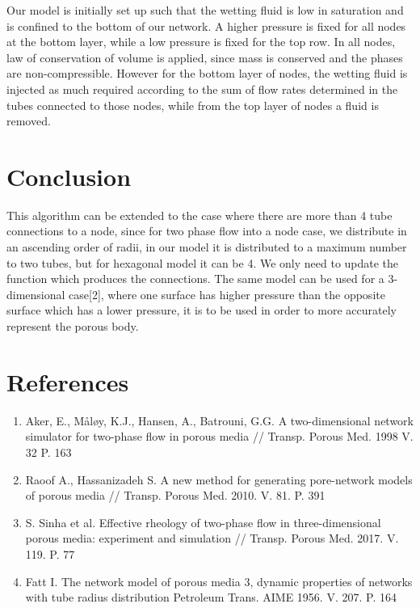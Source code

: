 \documentclass[12pt]{report}
\begin{document}
	Our model is initially set up such that the wetting fluid is low in saturation and is confined to the bottom of our network. A higher pressure is fixed for all nodes at the bottom layer, while a  low pressure is fixed for the top row. In all nodes, law of conservation of volume is applied, since mass is conserved and the phases are non-compressible. However for the bottom layer of nodes, the wetting fluid is injected as much required according to the sum of flow rates determined in the tubes connected to those nodes, while from the top layer of nodes a fluid is removed.
	\section{Conclusion}
	This algorithm can be extended to the case where there are more than 4 tube connections to a node, since for two phase flow into a node case, we distribute in an ascending order of radii, in our model it is distributed to a maximum number to two tubes, but for hexagonal model it can be 4. We only need to update the function which produces the connections. The same model can be used for a 3-dimensional case[2], where one surface has higher pressure than the opposite surface which has a lower pressure, it is to be used in order to more accurately represent the porous body.


\section{References}
	\begin{enumerate}
		\item Aker, E., Måløy, K.J., Hansen, A., Batrouni, G.G. A two-dimensional network simulator for two-phase flow in porous media // Transp. Porous Med. 1998 V. 32 P. 163 
		\item Raoof A., Hassanizadeh S. A new method for generating pore-network models of porous media // Transp. Porous Med. 2010. V. 81. P. 391
		\item S. Sinha et al. Effective rheology of two-phase flow in three-dimensional porous media: experiment and simulation // Transp. Porous Med. 2017. V. 119. P. 77
		\item Fatt I. The network model of porous media 3, dynamic properties of networks with tube radius distribution Petroleum Trans. AIME 1956. V. 207. P. 164
	\end{enumerate}
\end{document}
